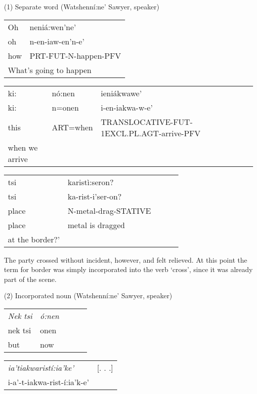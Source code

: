 \documentclass[output=paper,colorlinks,citecolor=brown
]{langscibook}
\begin{document}
(1) Separate word (Watshenní:ne' Sawyer, speaker)

\begin{tabular}{ll}
     Oh & neniá:wen’ne’\\
     oh & n-en-iaw-en’n-e’\\
     how & PRT-FUT-N-happen-PFV \\
     \multicolumn{2}{l}{What's going to happen }
\end{tabular}


 \vspace{5mm}
\bigskip

\begin{tabular}{lllll}
    ki: & nó:nen & ieniákwawe’\\
    ki: & n=onen & i-en-iakwa-w-e’\\
    this & ART=when & TRANSLOCATIVE-FUT-1EXCL.PL.AGT-arrive-PFV \\
    when we arrive
\end{tabular}

\bigskip

\begin{tabular}{lllll}
    tsi & karistì:seron? \\
    tsi & ka-rist-i’ser-on? \\
    place & N-metal-drag-STATIVE \\
    place & metal is dragged \\
    at the border?’	\\
\end{tabular}

\bigskip

The party crossed without incident, however, and felt relieved. At this point the term for border was simply incorporated into the verb `cross', since it was already part of the scene.\bigskip

(2) Incorporated noun (Watshenní:ne' Sawyer, speaker)

\begin{tabular}{lllll} 

    \emph{Nek tsi} & \emph{ó:nen} \\
    nek tsi & onen \\
    but & now \\
\end{tabular}

\vspace{5mm}
\begin{tabular}{ll} 
\emph{ia'tiakwaristí:ia'ke'}&{[}. . .{]}\\
i-a'-t-iakwa-rist-í:ia'k-e' \\
\end{tabular}
\end{document}
